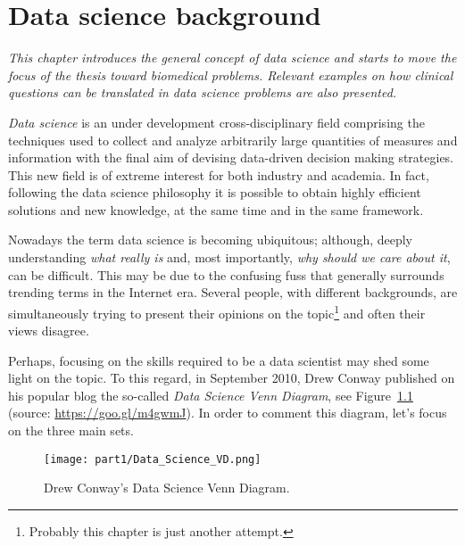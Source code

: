 
\chapter{Data science background} \label{chap:background}

\begin{displayquote}
	\textit{This chapter introduces the general concept of data science and starts to move the focus of the thesis toward biomedical problems. Relevant examples on how clinical questions can be translated in data science problems are also presented.}
\end{displayquote}

\textit{Data science} is an under development cross-disciplinary field comprising the techniques used to collect and analyze arbitrarily large quantities of measures and information with the final aim of devising data-driven decision making strategies.
This new field is of extreme interest for both industry and academia. In fact, following the data science philosophy it is possible to obtain highly efficient solutions and new knowledge, at the same time and in the same framework.

Nowadays the term data science is becoming ubiquitous; although, deeply understanding \textit{what really is} and, most importantly, \textit{why should we care about it}, can be difficult.
This may be due to the confusing fuss that generally surrounds trending terms in the Internet era. Several people, with different backgrounds, are simultaneously trying to present their opinions on the topic\footnote{ Probably this chapter is just another attempt.} and often their views disagree.

Perhaps, focusing on the skills required to be a data scientist may shed some light on the topic. To this regard, in September 2010, Drew Conway published on his popular blog the so-called \textit{Data Science Venn Diagram}, see Figure~\ref{fig:data_science_venn_diagram}  (source: \url{https://goo.gl/m4gwmJ}).
In order to comment this diagram, let's focus on the three main sets.

\begin{figure}[h!]
	\centering
	\texttt{[image: part1/Data\_Science\_VD.png]}
	\caption{Drew Conway's Data Science Venn Diagram.} \label{fig:data_science_venn_diagram}
\end{figure}

